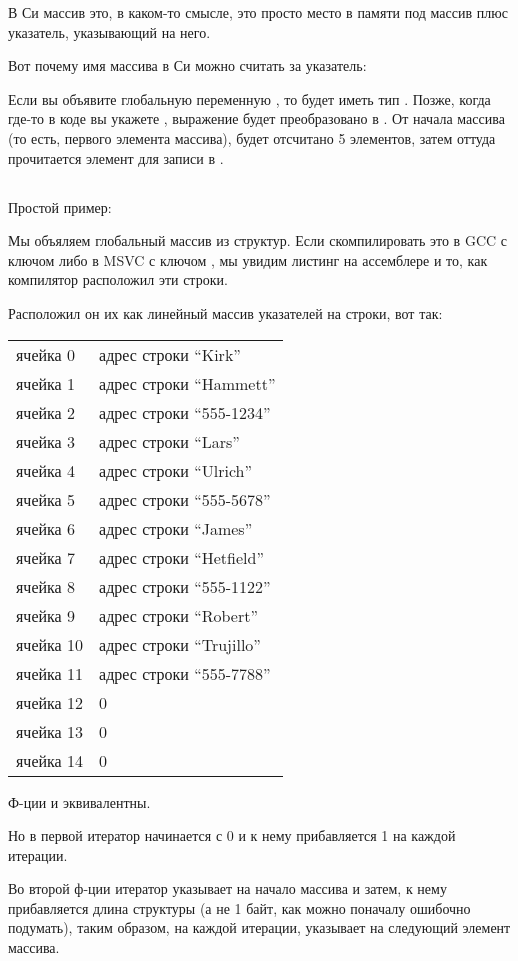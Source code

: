 В Си массив это, в каком-то смысле, это просто место в памяти под массив плюс указатель, указывающий
на него. 

Вот почему имя массива в Си можно считать за указатель:

Если вы объявите глобальную переменную , то  будет иметь тип .
Позже, когда где-то в коде
вы укажете , выражение будет преобразовано в . От начала массива (то есть, первого элемента
массива), будет отсчитано 5 элементов, затем оттуда прочитается элемент для записи в .

\subsection{}

Простой пример:



Мы объяляем глобальный массив из структур. Если скомпилировать это в GCC с ключом  либо в MSVC с ключом
, мы увидим листинг на ассемблере и то, как компилятор расположил эти строки. 

Расположил он их как линейный массив указателей на строки, вот так:

\begin{center}
\begin{tabular}{ | l | l | }
\hline
  ячейка 0    & адрес строки ``Kirk'' \\
  ячейка 1    & адрес строки ``Hammett'' \\
  ячейка 2    & адрес строки ``555-1234'' \\
  ячейка 3    & адрес строки ``Lars'' \\
  ячейка 4    & адрес строки ``Ulrich'' \\
  ячейка 5    & адрес строки ``555-5678'' \\
  ячейка 6    & адрес строки ``James'' \\
  ячейка 7    & адрес строки ``Hetfield'' \\
  ячейка 8    & адрес строки ``555-1122'' \\
  ячейка 9    & адрес строки ``Robert'' \\
  ячейка 10   & адрес строки ``Trujillo'' \\
  ячейка 11   & адрес строки ``555-7788'' \\
  ячейка 12   & 0 \\
  ячейка 13   & 0 \\
  ячейка 14   & 0 \\
\hline
\end{tabular}
\end{center}

Ф-ции  и  эквивалентны.

Но в первой итератор  начинается с 0 и к нему прибавляется 1 на каждой итерации.

Во второй ф-ции итератор  указывает на начало массива и затем, к нему прибавляется длина структуры 
(а не 1 байт, как можно поначалу ошибочно подумать),
таким образом, на каждой итерации,  указывает на следующий элемент массива.

